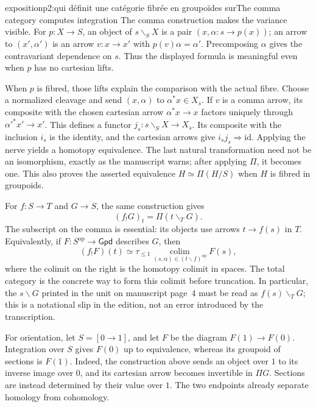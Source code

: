 \begin{dcomment}{exposition}{p2:qui définit une catégorie fibrée en groupoïdes sur}{The comma category computes integration}
The comma construction makes the variance visible. For $p:X\to S$, an object of $s\backslash_S X$ is a pair $(x,\alpha:s\to p(x))$; an arrow to $(x',\alpha')$ is an arrow $v:x\to x'$ with $p(v)\alpha=\alpha'$. Precomposing $\alpha$ gives the contravariant dependence on $s$. Thus the displayed formula is meaningful even when $p$ has no cartesian lifts.

When $p$ is fibred, those lifts explain the comparison with the actual fibre. Choose a normalized cleavage and send $(x,\alpha)$ to $\alpha^*x\in X_s$. If $v$ is a comma arrow, its composite with the chosen cartesian arrow $\alpha^*x\to x$ factors uniquely through $\alpha'^*x'\to x'$. This defines a functor $j_s:s\backslash_S X\to X_s$. Its composite with the inclusion $i_s$ is the identity, and the cartesian arrows give $i_sj_s\Rightarrow\mathrm{id}$. Applying the nerve yields a homotopy equivalence. The last natural transformation need not be an isomorphism, exactly as the manuscript warns; after applying $\Pi$, it becomes one. This also proves the asserted equivalence $H\simeq\Pi(H/S)$ when $H$ is fibred in groupoids.

For $f:S\to T$ and $G\to S$, the same construction gives
\[
 (f_!G)_t=\Pi(t\backslash_T G).
\]
The subscript on the comma is essential: its objects use arrows $t\to f(s)$ in $T$. Equivalently, if $F:S^{\mathrm{op}}\to\mathsf{Gpd}$ describes $G$, then
\[
 (f_!F)(t)\simeq
 \tau_{\leq1}\operatorname*{colim}_{(s,\alpha)\in(t\backslash f)^{\mathrm{op}}}F(s),
\]
where the colimit on the right is the homotopy colimit in spaces. The total category is the concrete way to form this colimit before truncation. In particular, the $s\backslash G$ printed in the unit on manuscript page~4 must be read as $f(s)\backslash_T G$; this is a notational slip in the edition, not an error introduced by the transcription.

For orientation, let $S=[0\to1]$, and let $F$ be the diagram $F(1)\to F(0)$. Integration over $S$ gives $F(0)$ up to equivalence, whereas its groupoid of sections is $F(1)$. Indeed, the construction above sends an object over $1$ to its inverse image over $0$, and its cartesian arrow becomes invertible in $\Pi G$. Sections are instead determined by their value over $1$. The two endpoints already separate homology from cohomology.
\end{dcomment}

